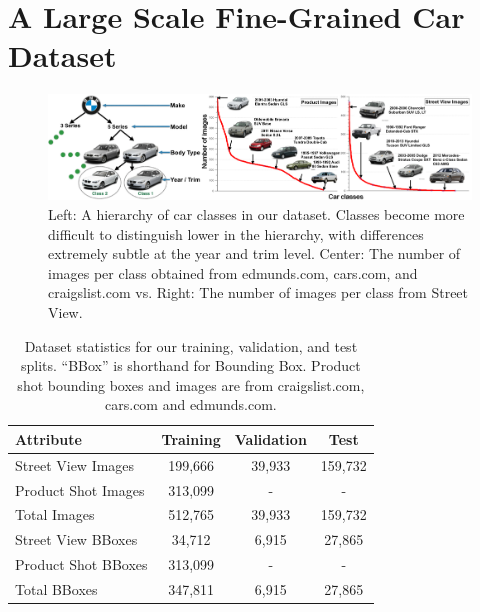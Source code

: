 \documentclass[letterpaper]{article}
\begin{document}
\section{A Large Scale Fine-Grained Car Dataset}

\begin{figure} [t]
\begin{center}
\includegraphics[width=1\linewidth]{img/car_hierarchy.png}
\end{center}
\caption {Left: A hierarchy of car classes in our dataset. Classes become more difficult to distinguish lower in the hierarchy, with
differences extremely subtle at the year and trim level. Center: The number of images per class obtained from edmunds.com, cars.com,
and craigslist.com vs. Right: The number of images per class from Street View.}
\label{fig:img_dist}
\end{figure}

\begin{table}
\begin{center}
\begin{tabular}{|l|c|c|c|}
\hline
\textbf{Attribute} & \textbf{Training} & \textbf{Validation} & \textbf{Test} \\
\hline\hline
Street View Images & 199,666 & 39,933 &159,732\\
Product Shot Images & 313,099 & - &-\\
\hline\hline
Total Images &512,765&39,933&159,732\\
\hline\hline
Street View BBoxes & 34,712 & 6,915 &27,865\\
Product Shot BBoxes & 313,099 & - &-\\
\hline\hline
Total BBoxes & 347,811 & 6,915 &27,865\\
\hline
\end{tabular}
\end{center}
\caption{Dataset statistics for our training, validation, and test splits. ``BBox'' is shorthand for Bounding Box. Product shot bounding boxes and images are from craigslist.com, cars.com and edmunds.com.}
\label{table:data-stat}
\end{table}
\end{document}
